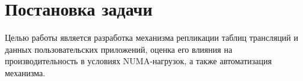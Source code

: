 \section{Постановка задачи}
\label{sec:Chapter1} 


Целью работы является разработка механизма репликации таблиц трансляций и данных пользовательских приложений, оценка его влияния на производительность в условиях NUMA-нагрузок, а также автоматизация механизма.

